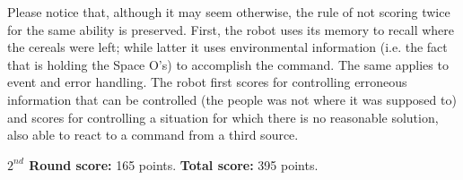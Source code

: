 Please notice that, although it may seem otherwise, the rule of not scoring twice for the same ability is preserved. First, the robot uses its memory to recall where the cereals were left; while latter it uses environmental information (i.e. the fact that is holding the Space O's) to accomplish the command. The same applies to event and error handling. The robot first scores for controlling erroneous information that can be controlled (the people was not where it was supposed to) and scores for controlling a situation for which there is no reasonable solution, also able to react to a command from a third source.

\textbf{$2^{nd}$ Round score:} 165 points. \textbf{Total score:} 395 points.
